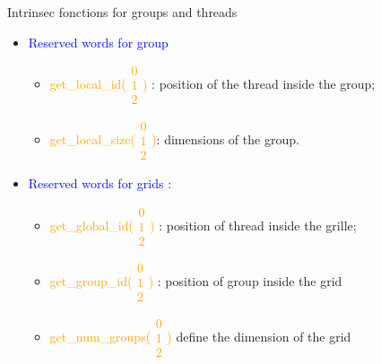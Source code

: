 \documentclass{beamer}
\begin{document}
\begin{frame}[containsverbatim]{Intrinsec fonctions for groups and threads}
\begin{minipage}{55mm}
\begin{itemize}
\item \textcolor{blue}{Reserved words for group}
  \begin{itemize}
  \item \textcolor{orange}{\small get\_local\_id({\tiny$\begin{array}{c}0\\1\\2\end{array}$})} :
    position of the thread inside the  group;
  \item \textcolor{orange}{\small get\_local\_size({\tiny$\begin{array}{c}0\\1\\2\end{array}$})}: 
    dimensions of the group.
  \end{itemize}
\item \textcolor{blue}{Reserved words for grids} :
  \begin{itemize}
  \item \textcolor{orange}{\small get\_global\_id({\tiny$\begin{array}{c}0\\1\\2\end{array}$})}
  : position of thread inside the grille;
  \item \textcolor{orange}{\small get\_group\_id({\tiny$\begin{array}{c}0\\1\\2\end{array}$})}
    : position of group inside the grid
  \item \textcolor{orange}{\small get\_num\_groups({\tiny$\begin{array}{c}0\\1\\2\end{array}$})} 
    define the dimension of the grid
  \end{itemize}
\end{itemize}
\end{minipage}
\begin{minipage}[c]{50mm}
\end{minipage}
\end{frame}
\end{document}
